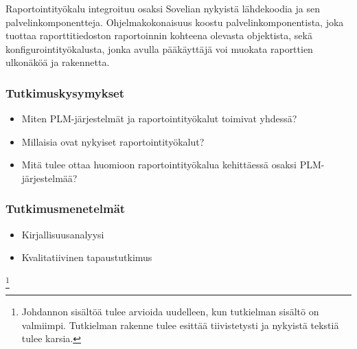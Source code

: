 Raportointityökalu integroituu osaksi Sovelian nykyistä lähdekoodia ja sen palvelinkomponentteja. Ohjelmakokonaisuus koostu palvelinkomponentista, joka tuottaa raporttitiedoston raportoinnin kohteena olevasta objektista, sekä konfigurointityökalusta, jonka avulla pääkäyttäjä voi muokata raporttien ulkonäköä ja rakennetta.

\subsubsection{Tutkimuskysymykset}
\begin{itemize}
\item Miten PLM-järjestelmät ja raportointityökalut toimivat yhdessä?
\item Millaisia ovat nykyiset raportointityökalut?
\item Mitä tulee ottaa huomioon raportointityökalua kehittäessä osaksi PLM-järjestelmää?
\end{itemize}

\subsubsection{Tutkimusmenetelmät}
\begin{itemize}
\item Kirjallisuusanalyysi
\item Kvalitatiivinen tapaustutkimus
\end{itemize}

\footnote{Johdannon sisältöä tulee arvioida uudelleen, kun tutkielman sisältö on valmiimpi. Tutkielman rakenne tulee esittää tiivistetysti ja nykyistä tekstiä tulee karsia.}
